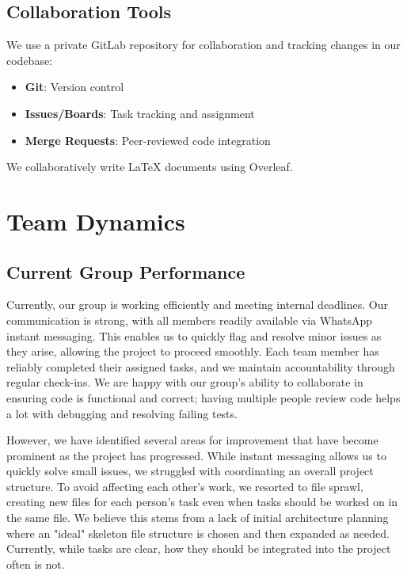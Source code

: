 \documentclass[9.5pt]{article}
\begin{document}
\subsection{Collaboration Tools}
We use a private GitLab repository for collaboration and tracking changes in our codebase:
\begin{itemize}[leftmargin=1.5em, itemsep=0pt, topsep=0pt]
    \item \textbf{Git}: Version control
    \item \textbf{Issues/Boards}: Task tracking and assignment
    \item \textbf{Merge Requests}: Peer-reviewed code integration
\end{itemize}
We collaboratively write LaTeX documents using Overleaf.

\section{Team Dynamics}
\subsection{Current Group Performance}
Currently, our group is working efficiently and meeting internal deadlines. Our communication is strong, with all members readily available via WhatsApp instant messaging. This enables us to quickly flag and resolve minor issues as they arise, allowing the project to proceed smoothly. Each team member has reliably completed their assigned tasks, and we maintain accountability through regular check-ins. We are happy with our group's ability to collaborate in ensuring code is functional and correct; having multiple people review code helps a lot with debugging and resolving failing tests. 

\noindent However, we have identified several areas for improvement that have become prominent as the project has progressed. While instant messaging allows us to quickly solve small issues, we struggled with coordinating an overall project structure. To avoid affecting each other's work, we resorted to file sprawl, creating new files for each person's task even when tasks should be worked on in the same file. We believe this stems from a lack of initial architecture planning where an "ideal" skeleton file structure is chosen and then expanded as needed. Currently, while tasks are clear, how they should be integrated into the project often is not.
\end{document}
